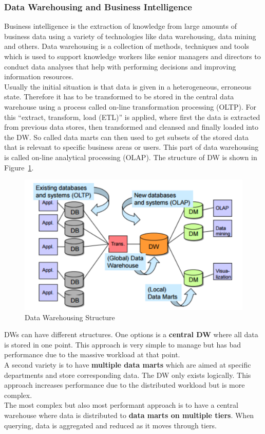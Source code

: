 \subsubsection{Data Warehousing and Business Intelligence}
Business intelligence is the extraction of knowledge from large amounts of business data using a variety of technologies like data warehousing, data mining and others.
Data warehousing is a collection of methods, techniques and tools which is used to support knowledge workers like senior managers and directors to conduct data analyses that help with performing decisions and improving information resources.\\
Usually the initial situation is that data is given in a heterogeneous, erroneous state.
Therefore it has to be transformed to be stored in the central data warehouse using a process called on-line transformation processing (OLTP).
For this ``extract, transform, load (ETL)'' is applied, where first the data is extracted from previous data stores, then transformed and cleansed and finally loaded into the DW\@.
So called data marts can then used to get subsets of the stored data that is relevant to specific business areas or users.
This part of data warehousing is called on-line analytical processing (OLAP).
The structure of DW is shown in Figure~\ref{fig:data_warehousing}.\\
\begin{figure}[h]
  \centering
  \includegraphics[width=.8\textwidth]{images/data_warehousing.png}
  \caption{Data Warehousing Structure}\label{fig:data_warehousing}
\end{figure}

DWs can have different structures.
One options is a \textbf{central DW} where all data is stored in one point.
This approach is very simple to manage but has bad performance due to the massive workload at that point.\\
A second variety is to have \textbf{multiple data marts} which are aimed at specific departments and store corresponding data.
The DW only exists logically.
This approach increases performance due to the distributed workload but is more complex.\\
The most complex but also most performant approach is to have a central warehouse where data is distributed to \textbf{data marts on multiple tiers}.
When querying, data is aggregated and reduced as it moves through tiers.\\

